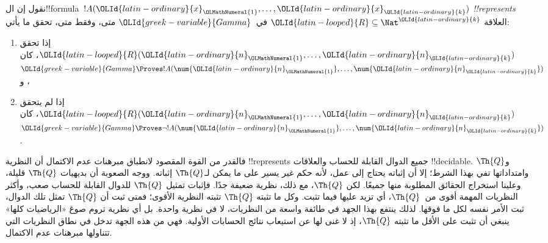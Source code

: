 \documentclass[../../../include/open-logic-section]{subfiles}
\begin{document}
\begin{defn}
نقول إن ال!!{formula}~$!A({\OLId{latin-ordinary}{x}}_{\OLMathNumeral{1}},\dots,{\OLId{latin-ordinary}{x}}_{\OLId{latin-ordinary}{k}})$ \emph{!!{represents}} العلاقة
${\OLId{latin-looped}{R}}\subseteq\Nat^{\OLId{latin-ordinary}{k}}$ في~${\OLId{greek-variable}{Gamma}}$ متى، وفقط متى، تحقق ما يأتي:
\begin{enumerate}
\item إذا تحقق ${\OLId{latin-looped}{R}}({\OLId{latin-ordinary}{n}}_{\OLMathNumeral{1}},\dots,{\OLId{latin-ordinary}{n}}_{\OLId{latin-ordinary}{k}})$، كان
${\OLId{greek-variable}{Gamma}}\Proves !A(\num{{\OLId{latin-ordinary}{n}}_{\OLMathNumeral{1}}},\dots,\num{{\OLId{latin-ordinary}{n}}_{\OLId{latin-ordinary}{k}}})$، و
\item إذا لم يتحقق ${\OLId{latin-looped}{R}}({\OLId{latin-ordinary}{n}}_{\OLMathNumeral{1}},\dots,{\OLId{latin-ordinary}{n}}_{\OLId{latin-ordinary}{k}})$، كان ${\OLId{greek-variable}{Gamma}}\Proves\lnot
!A(\num{{\OLId{latin-ordinary}{n}}_{\OLMathNumeral{1}}},\dots,\num{{\OLId{latin-ordinary}{n}}_{\OLId{latin-ordinary}{k}}})$.
\end{enumerate}
\end{defn}

فالقدر من القوة المقصود لانطباق مبرهنات عدم الاكتمال
أن النظرية !!{represents} جميع الدوال القابلة للحساب
والعلاقات !!{decidable}. و$\Th{Q}$ وامتداداتها
تفي بهذا الشرط؛ إلا أن إثباته يحتاج إلى عمل،
لأنه حكم غير يسير على ما يمكن لـ$\Th{Q}$ إثباته.
ووجه الصعوبة أن بديهيات $\Th{Q}$ قليلة،
وعلينا استخراج الحقائق المطلوبة منها جميعًا.
لكن $\Th{Q}$، مع ذلك، نظرية ضعيفة جدًا.
فإثبات تمثيل $\Th{Q}$ للدوال القابلة للحساب
صعب، وأكثر النظريات المهمة أقوى من~$\Th{Q}$،
أي تزيد عليها فيما تثبت. وكل ما تثبته
$\Th{Q}$ تثبته النظرية الأقوى؛ فمتى ثبت
أن $\Th{Q}$ تمثل تلك الدوال، ثبت الأمر نفسه
لكل ما فوقها. لذلك ينتفع بهذا الجهد في طائفة
واسعة من النظريات، لا في نظرية واحدة.
بل أي نظرية تروم صوغ «الرياضيات كلها» ينبغي
أن تثبت على الأقل ما تثبته $\Th{Q}$،
إذ لا غنى لها عن استيعاب نتائج الحسابات
الأولية. فهي من هذه الجهة تدخل في نطاق
النظريات التي تتناولها مبرهنات عدم الاكتمال.
\end{document}
